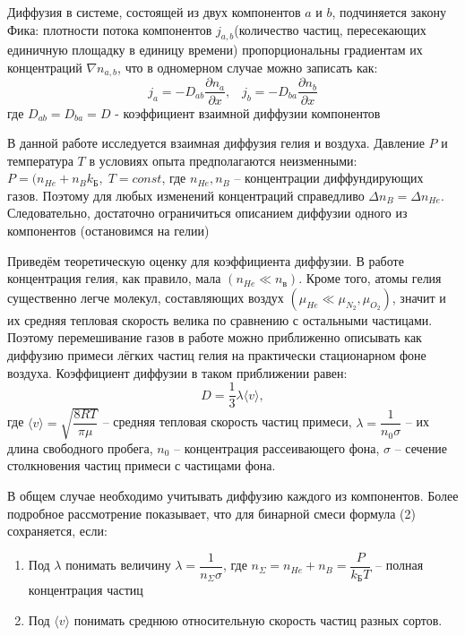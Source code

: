 \documentclass[a4paper,12pt]{article}
\begin{document}
Диффузия в системе, состоящей из двух компонентов $a$ и $b$, подчиняется закону Фика: плотности потока компонентов $j_{a,b}$(количество частиц, пересекающих единичную площадку в единицу времени) пропорциональны градиентам их концентраций $\nabla n_{a, b}$, что в одномерном случае можно записать как:
\begin{equation}
j_a = -D_{ab}\frac{\partial n_a}{\partial x}, 
\;\;\; j_b = -D_{ba}\frac{\partial n_b}{\partial x}
\end{equation} 
где $D_{ab} = D_{ba} = D$ - коэффициент взаимной диффузии компонентов

В данной работе исследуется взаимная диффузия гелия и воздуха. Давление $P$ и температура $T$ в условиях опыта предполагаются неизменными: $P = (n_{He}+n_{B}k_\text{Б},\; T = const$, где $n_{He}, n_{B}$ -- концентрации диффундирующих газов. Поэтому для любых изменений концентраций справедливо $\Delta n_{B} = \Delta n_{He}$. Следовательно, достаточно ограничиться описанием диффузии одного из компонентов (остановимся на гелии)

Приведём теоретическую оценку для коэффициента диффузии. В работе концентрация гелия, как правило, мала $(n_{He}\ll n_{в})$. Кроме того, атомы гелия
существенно легче молекул, составляющих воздух $(\mu_{He}\ll\mu_{N_2},\mu_{O_2})$, значит и их средняя тепловая скорость велика по сравнению с остальными частицами. Поэтому перемешивание газов в работе можно приближенно описывать как диффузию примеси лёгких частиц гелия на практически стационарном фоне воздуха. Коэффициент диффузии в таком приближении равен:
\begin{equation}
D = \frac{1}{3}\lambda\langle v \rangle,
\end{equation}
где $\langle v \rangle = \sqrt{\dfrac{8RT}{\pi\mu}}$ -- средняя тепловая скорость частиц примеси, $\lambda = \dfrac{1}{n_0\sigma}$ -- их длина свободного пробега, $n_0$ -- концентрация рассеивающего фона, $\sigma$ -- сечение столкновения частиц примеси с частицами фона.

В общем случае необходимо учитывать диффузию каждого из
компонентов. Более подробное рассмотрение показывает, что для бинарной смеси формула (2) сохраняется, если:
\begin{enumerate}
\itemsep0em
\item Под $\lambda$ понимать величину $\lambda = \dfrac{1}{n_{\Sigma}\sigma}$, где $n_{\Sigma}=n_{He}+n_{B} = \dfrac{P}{k_{\text{Б}}T}$ -- полная концентрация частиц
\item Под $\langle v \rangle$ понимать среднюю относительную скорость частиц разных сортов.

\end{enumerate}
\end{document}

